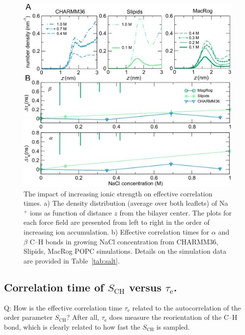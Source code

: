 \documentclass[journal=jpcbfk,manuscript=article,layout=twocolumn]{achemso}
\begin{document}

\begin{figure}[ht!]
\centering
\includegraphics[scale=0.36]{./figures/salt.pdf} 
\caption{The impact of increasing ionic strength on effective correlation times. a) The density distribution (average over both leaflets) of Na$^{+}$ ions as function of distance $z$ from the bilayer center. The plots for each force field are presented from left to right in the order of increasing ion accumulation. b) Effective correlation times for $\alpha$ and $\beta$ C--H bonds in growing NaCl concentration from CHARMM36, Slipids, MacRog POPC simulations. Details on the simulation data are provided in Table~\ref{tab:salt}.}
\label{fig:salt}
\end{figure}


\subsection*{Correlation time of $S_\mathrm{CH}$ versus $\tau_\mathrm e$.}

Q: How is the effective correlation time $\tau_\mathrm e$ related to the autocorrelation of the order parameter $S_\mathrm{CH}$?
After all, $\tau_\mathrm e$ does measure the reorientation of the C--H bond, which is clearly related to how fast the $S_\mathrm{CH}$ is sampled.
\end{document}
